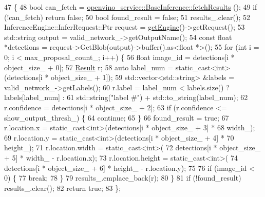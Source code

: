 \begin{DoxyCode}
47                                                  \{
48   \textcolor{keywordtype}{bool} can\_fetch = \hyperlink{classopenvino__service_1_1BaseInference_a9604e193581d6f458634035059342a2c}{openvino\_service::BaseInference::fetchResults}
      ();
49   \textcolor{keywordflow}{if} (!can\_fetch) \textcolor{keywordflow}{return} \textcolor{keyword}{false};
50   \textcolor{keywordtype}{bool} found\_result = \textcolor{keyword}{false};
51   results\_.clear();
52   InferenceEngine::InferRequest::Ptr request = \hyperlink{classopenvino__service_1_1BaseInference_a27ef6d92c87dec4480f818a2bcca62a4}{getEngine}()->getRequest();
53   std::string output = valid\_network\_->getOutputName();
54   \textcolor{keyword}{const} \textcolor{keywordtype}{float} *detections = request->GetBlob(output)->buffer().as<\textcolor{keywordtype}{float} *>();
55   \textcolor{keywordflow}{for} (\textcolor{keywordtype}{int} i = 0; i < max\_proposal\_count\_; i++) \{
56     \textcolor{keywordtype}{float} image\_id = detections[i * object\_size\_ + 0];
57     \hyperlink{classopenvino__service_1_1FaceDetection_a35ec2b5ed353d7f08a5475df7cccb249}{Result} r;
58     \textcolor{keyword}{auto} label\_num = \textcolor{keyword}{static\_cast<}\textcolor{keywordtype}{int}\textcolor{keyword}{>}(detections[i * object\_size\_ + 1]);
59     std::vector<std::string> &labels = valid\_network\_->getLabels();
60     r.label = label\_num < labels.size() ? labels[label\_num] :
61               std::string(\textcolor{stringliteral}{"label #"}) + std::to\_string(label\_num);
62     r.confidence = detections[i * object\_size\_ + 2];
63     \textcolor{keywordflow}{if} (r.confidence <= show\_output\_thresh\_) \{
64       \textcolor{keywordflow}{continue};
65     \}
66     found\_result = \textcolor{keyword}{true};
67     r.location.x = \textcolor{keyword}{static\_cast<}\textcolor{keywordtype}{int}\textcolor{keyword}{>}(detections[i * object\_size\_ + 3] *
68         width\_);
69     r.location.y = \textcolor{keyword}{static\_cast<}\textcolor{keywordtype}{int}\textcolor{keyword}{>}(detections[i * object\_size\_ + 4] *
70         height\_);
71     r.location.width = \textcolor{keyword}{static\_cast<}\textcolor{keywordtype}{int}\textcolor{keyword}{>}(
72         detections[i * object\_size\_ + 5] * width\_ - r.location.x);
73     r.location.height = \textcolor{keyword}{static\_cast<}\textcolor{keywordtype}{int}\textcolor{keyword}{>}(
74         detections[i * object\_size\_ + 6] * height\_ - r.location.y);
75 
76     \textcolor{keywordflow}{if} (image\_id < 0) \{
77       \textcolor{keywordflow}{break};
78     \}
79     results\_.emplace\_back(r);
80   \}
81   \textcolor{keywordflow}{if} (!found\_result) results\_.clear();
82   \textcolor{keywordflow}{return} \textcolor{keyword}{true};
83 \};
\end{DoxyCode}
